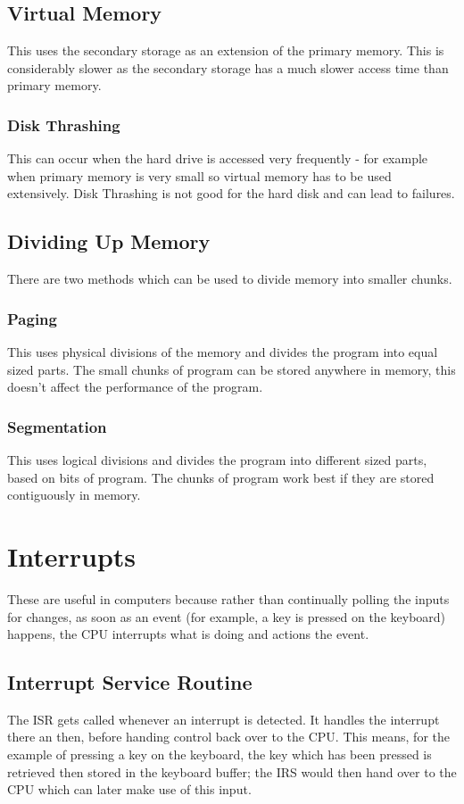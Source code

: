 \documentclass[a4paper,11pt, twocolumn]{article}
\begin{document}
\subsection{Virtual Memory}
This uses the secondary storage as an extension of the primary memory. This is considerably slower as the secondary storage has a much slower access time than primary memory. 
\subsubsection{Disk Thrashing}
This can occur when the hard drive is accessed very frequently - for example when primary memory is very small so virtual memory has to be used extensively. Disk Thrashing is not good for the hard disk and can lead to failures. 
\subsection{Dividing Up Memory}
There are two methods which can be used to divide memory into smaller chunks.
\subsubsection{Paging}
This uses physical divisions of the memory and divides the program into equal sized parts. The small chunks of program can be stored anywhere in memory, this doesn't affect the performance of the program.
\subsubsection{Segmentation}
This uses logical divisions and divides the program into different sized parts, based on bits of program. The chunks of program work best if they are stored contiguously in memory. 

\section{Interrupts}
These are useful in computers because rather than continually polling the inputs for changes, as soon as an event (for example, a key is pressed on the keyboard) happens, the CPU interrupts what is doing and actions the event. 
\subsection{Interrupt Service Routine}
The ISR gets called whenever an interrupt is detected. It handles the interrupt there an then, before handing control back over to the CPU. This means, for the example of pressing a key on the keyboard, the key which has been pressed is retrieved then stored in the keyboard buffer; the IRS would then hand over to the CPU which can later make use of this input.
\end{document}
